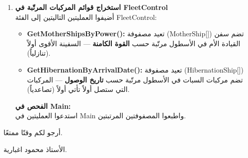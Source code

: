 \documentclass[14pt]{extarticle}
\begin{document}
\begin{enumerate}[label=\textbf{تمرين \arabic*:}, wide=0pt, leftmargin=*, itemsep=2.2em]
    \item \textbf{استخراج قوائم المركبات المرتّبة في \textenglish{FleetControl}} \\
    أضيفوا العمليتين التاليتين إلى الفئة \textenglish{FleetControl}:
    \begin{itemize}
        \item \textbf{\textenglish{GetMotherShipsByPower()}:} تعيد مصفوفة (\textenglish{MotherShip[]}) تضم سفن القيادة الأم في الأسطول مرتّبة حسب \textbf{القوة الكامنة} — السفينة الأقوى أولاً (تنازلياً).
        \item \textbf{\textenglish{GetHibernationByArrivalDate()}:} تعيد مصفوفة (\textenglish{HibernationShip[]}) تضم مركبات السبات في الأسطول مرتّبة حسب \textbf{تاريخ الوصول} — المركبات التي ستصل أولاً تأتي أولاً (تصاعدياً).
    \end{itemize}
    \textbf{الفحص في \textenglish{Main}:} \\
    استدعوا العمليتين في \textenglish{Main} واطبعوا المصفوفتين المرتبتين.

\end{enumerate}

\vspace{1cm}
\begin{flushleft}
أرجو لكم وقتًا ممتعًا.

الأستاذ محمود اغبارية.
\end{flushleft}
\end{document}
